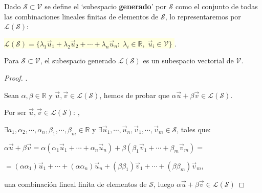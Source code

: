 \begin{defi}
Dado $\mathcal S \subset \mathcal V$ se define el `subespacio \textbf{generado}' por $\mathcal S$	como el conjunto de todas las combinaciones lineales finitas de elementos de $\mathcal S$, lo representaremos por $\mathcal{L(S)}$:

\vspace{2mm}
\centerline{\noindent \colorbox{LightYellow}{
	$\mathcal {L(S)}= \{\lambda_1 \vec u_1 + \lambda_2 \vec u_2 + \cdots +\lambda_n \vec u_n:\; \lambda_i \in \mathbb R, \; 
	 \vec u_i \in \mathcal V \}$
}\normalsize{.}}

\end{defi}


\begin{prop}
Para $	\mathcal S \subset \mathcal V$, el subespacio generado  $\mathcal {L(S)}$ es un subespacio vectorial de $\mathcal V$.
\end{prop}

\begin{proof}.

\noindent \textcolor{gris}{Sean $\alpha, \beta \in \mathbb R$ y $\vec u, \vec v \in \mathcal {L(S)}$, hemos de probar que $\alpha \vec u + \beta \vec v \in \mathcal {L(S)}$.}

\noindent \textcolor{gris}{Por ser $\vec u, \vec v  \in \mathcal {L(S)}$: ,}

\noindent \textcolor{gris}{$\exists a_1, \alpha_2, \cdots, \alpha_n, \beta_1, \cdots , \beta_m \in \mathbb R$ y 
$\exists \vec u_1, \cdots, \vec u_n, \vec v_1, \cdots , \vec v_m \in \mathcal S $, tales que:}

\noindent \textcolor{gris}{$\alpha \vec u + \beta \vec v = \alpha (\alpha_1 \vec u_1 + \cdots + \alpha_n \vec u_n) + \beta (\beta_1 \vec v_1+ \cdots + \beta_m \vec v_m)=$}

\noindent \textcolor{gris}{$= (\alpha \alpha_1) \vec u_1 + \cdots + (\alpha \alpha_n) \vec u_n + (\beta \beta_1) \vec v_1+ \cdots + (\beta \beta_m) \vec v_m $,} 

\noindent \textcolor{gris}{una combinación lineal finita de elementos de $\mathcal S$, luego $\alpha \vec u + \beta \vec v \in \mathcal {L(S)}$}

\end{proof}


